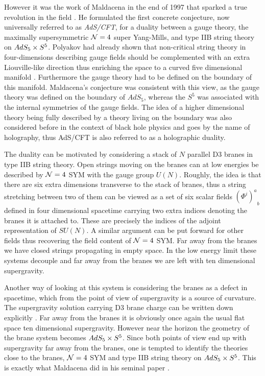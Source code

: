 However it was the work of Maldacena in the end of 1997 that sparked a true revolution in the field \cite{Maldacena:1997re}. 
He formulated the first concrete conjecture, now universally referred to as \emph{AdS/CFT}, for a duality between a gauge theory, the maximally supersymmetric $\mathcal{N}=4$ super Yang-Mills, and type IIB string theory on $AdS_5 \times S^5$. 
Polyakov had already shown that non-critical string theory in four-dimensions describing gauge fields should be complemented with an extra Liouville-like direction thus enriching the space to a curved five dimensional manifold \cite{Polyakov:1997tj}. Furthermore the gauge theory had to be defined on the boundary of this manifold.
Maldacena's conjecture was consistent with this view, as the gauge theory was defined on the boundary of $AdS_5$, whereas the $S^5$ was associated with the internal symmetries of the gauge fields.
The idea of a higher dimensional theory being fully described by a theory living on the boundary was also considered before in the context of black hole physics \cite{'tHooft:1993gx, Susskind:1994vu} and goes by the name of holography, thus AdS/CFT is also referred to as a holographic duality.

The duality can be motivated by considering a stack of $N$ parallel D3 branes in type IIB string theory. 
Open strings moving on the branes can at low energies be described by $\mathcal{N}=4$ SYM with the gauge group $U(N)$. 
Roughly, the idea is that there are six extra dimensions transverse to the stack of branes, thus a string stretching between two of them can be viewed as a set of six scalar fields ${(\Phi^i)^a}_b$ defined in four dimensional spacetime carrying two extra indices denoting the branes it is attached to. 
These are precisely the indices of the adjoint representation of $SU(N)$.
A similar argument can be put forward for other fields thus recovering the field content of $\mathcal{N}=4$ SYM.
Far away from the branes we have closed strings propagating in empty space. 
In the low energy limit these systems decouple and far away from the branes we are left with ten dimensional supergravity.

Another way of looking at this system is considering the branes as a defect in spacetime, which from the point of view of supergravity is a source of curvature. 
The supergravity solution carrying D3 brane charge can be written down explicitly \cite{Horowitz:1991cd}.
Far away from the branes it is obviously once again the usual flat space ten dimensional supergravity.
However near the horizon the geometry of the brane system becomes $AdS_5 \times S^5$.
Since both points of view end up with supergravity far away from the branes, one is tempted to identify the theories close to the branes, $\mathcal{N}=4$ SYM and type IIB string theory on $AdS_5 \times S^5$. 
This is exactly what Maldacena did in his seminal paper \cite{Maldacena:1997re}. 

